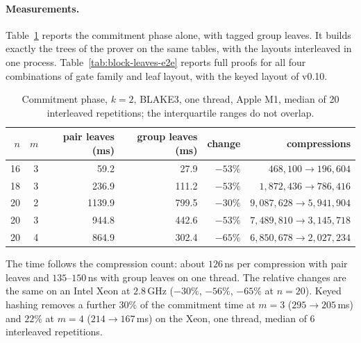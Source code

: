 \paragraph{Measurements.} Table~\ref{tab:block-leaves} reports the commitment phase alone, with tagged
group leaves. It builds exactly the trees of the prover on the same tables, with the layouts interleaved in one
process. Table~\ref{tab:block-leaves-e2e} reports full proofs for all four combinations of gate family and
leaf layout, with the keyed layout of v0.10.
\begin{table}[h]
\centering
\begin{tabular}{rrrrrr}
\toprule
$n$ & $m$ & pair leaves (ms) & group leaves (ms) & change & compressions\\
\midrule
16 & 3 & 59.2 & 27.9 & $-53\%$ & $468{,}100\to196{,}604$\\
18 & 3 & 236.9 & 111.2 & $-53\%$ & $1{,}872{,}436\to786{,}416$\\
20 & 2 & 1139.9 & 799.5 & $-30\%$ & $9{,}087{,}628\to5{,}941{,}904$\\
20 & 3 & 944.8 & 442.6 & $-53\%$ & $7{,}489{,}810\to3{,}145{,}718$\\
20 & 4 & 864.9 & 302.4 & $-65\%$ & $6{,}850{,}678\to2{,}027{,}234$\\
\bottomrule
\end{tabular}
\caption{Commitment phase, $k=2$, BLAKE3, one thread, Apple M1, median of 20 interleaved
repetitions; the interquartile ranges do not overlap.}
\label{tab:block-leaves}
\end{table}
The time follows the compression count: about $126$\,ns per compression with pair leaves and
$135$--$150$\,ns with group leaves on one thread. The relative changes are the same on an Intel
Xeon at $2.8$\,GHz ($-30\%$, $-56\%$, $-65\%$ at $n=20$). Keyed hashing removes a further
$30\%$ of the commitment time at $m=3$ ($295\to205$\,ms) and $22\%$ at $m=4$ ($214\to167$\,ms) on the
Xeon, one thread, median of 6 interleaved repetitions.

